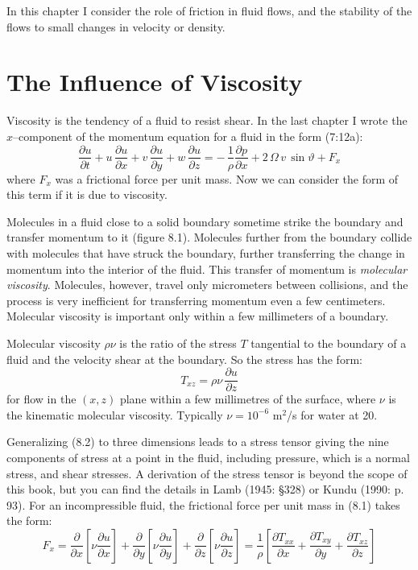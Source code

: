 In this chapter I consider the role of friction in fluid flows, and
the stability of the flows to small changes in velocity or density.

\section{The Influence of Viscosity}
Viscosity is the tendency of a fluid to resist
shear. In the last chapter I wrote the $x$--component of the momentum
equation for a fluid in the form (7:12a):
\begin{equation}
\frac{\partial{u}}{\partial{t}}+u\,\frac{\partial{u}}{\partial{x}}+v\,
\frac{\partial{u}}{\partial{y}}+w\,\frac{\partial{u}}{\partial{z}}=-\,
\frac{1}{\rho}\frac{\partial{p}}{\partial{x}} + 2\,\Omega\,v\,\sin\vartheta + F_x
\end{equation}
where $F_x$ was a frictional force per unit mass. Now we can consider
the form of this term if it is due to viscosity.

Molecules in a fluid close to a solid boundary sometime strike the
boundary and transfer momentum to it (figure 8.1). Molecules further
from the boundary collide with molecules that have struck the
boundary, further transferring the change in momentum into the
interior of the fluid. This transfer of momentum is \textit{molecular
  viscosity}. Molecules,
however, travel only micrometers between collisions, and the process
is very inefficient for transferring momentum even a few
centimeters. Molecular viscosity is important only within a few
millimeters of a boundary.

Molecular viscosity $\rho \nu$ is the ratio of the stress $T$
tangential to the boundary of a fluid and the velocity shear at the
boundary. So the stress has the form:
\begin{equation}
T_{xz} =  \rho \nu \,\frac{\partial{u}}{\partial{z}}
\end{equation}
for flow in the $(x, z)$ plane within a few millimetres of the
surface, where $\nu$ is the kinematic molecular viscosity. Typically
$\nu = 10^{-6}$ m$^2$/s for water at 20.

Generalizing (8.2) to three dimensions leads to a stress tensor giving
the nine components of stress at a point in the fluid, including
pressure, which is a normal stress, and shear stresses. A derivation
of the stress tensor is beyond the scope of this book, but you can
find the details in Lamb (1945: \S 328) or Kundu (1990: p. 93). For an
incompressible fluid, the frictional force per unit mass in (8.1)
takes the form:
\begin{equation}
F_x= \frac{\partial }{\partial x} \left[ \nu \frac{\partial u}{\partial x} \right]
   + \frac{\partial }{\partial y} \left[ \nu \frac{\partial u}{\partial y} \right]
   + \frac{\partial }{\partial z} \left[ \nu \frac{\partial u}{\partial z} \right]
= \frac{1}{\rho} \left[ \frac{\partial T_{xx}}{\partial x} +
                        \frac{\partial T_{xy}}{\partial y} +
                        \frac{\partial T_{xz}}{\partial z} \right]
\end{equation}

